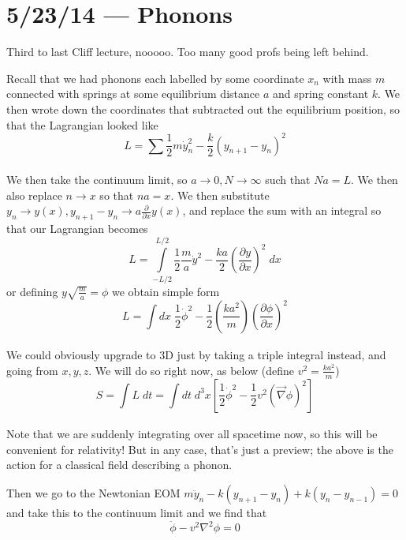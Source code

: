 \documentclass[10pt]{report}
\newcommand{\pd}[2]{\frac{\partial #1}{\partial#2}}
\begin{document}
\chapter{5/23/14 --- Phonons}

Third to last Cliff lecture, nooooo. Too many good profs being left behind.

Recall that we had phonons each labelled by some coordinate $x_n$ with mass $m$ connected with springs at some equilibrium distance $a$ and spring constant $k$. We then wrote down the coordinates that subtracted out the equilibrium position, so that the Lagrangian looked like
\begin{equation}
    L = \sum\limits_{}^{}\frac{1}{2} m\dot{y}_n^2 - \frac{k}{2}\left( y_{n+1} - y_n \right)^2
\end{equation}

We then take the continuum limit, so $a\to 0, N \to \infty$ such that $Na = L$. We then also replace $n \to x$ so that $na = x$. We then substitute $y_n \to y(x), y_{n+1} - y_n \to a \pd{}{x}y(x)$, and replace the sum with an integral so that our Lagrangian becomes
\begin{equation}
    L = \int\limits_{-L/2}^{L/2} \frac{1}{2}\frac{m}{a}\dot{y}^2 - \frac{ka}{2}\left( \pd{y}{x} \right)^2\;dx
\end{equation}
or defining $y\sqrt{\frac{m}{a}} = \phi$ we obtain simple form
\begin{equation}
    L = \int\limits_{}^{}dx\;\frac{1}{2}\dot{\phi}^2 - \frac{1}{2}\left( \frac{ka^2}{m} \right)\left( \pd{\phi}{x} \right)^2
\end{equation}

We could obviously upgrade to 3D just by taking a triple integral instead, and going from $x,y,z$. We will do so right now, as below (define $v^2 = \frac{ka^2}{m}$)
\begin{equation}
    S = \int\limits_{}^{}L\;dt = \int\limits_{}^{}dt\;d^3x\left[ \frac{1}{2}\dot{\phi}^2 - \frac{1}{2}v^2\left( \vec{\nabla}\phi \right)^2 \right]
\end{equation}

Note that we are suddenly integrating over all spacetime now, so this will be convenient for relativity! But in any case, that's just a preview; the above is the action for a classical field describing a phonon.

Then we go to the Newtonian EOM $m\ddot{y}_n - k\left( y_{n+1} - y_n \right) + k(y_n - y_{n-1}) = 0$ and take this to the continuum limit and we find that 
\begin{equation}
    \ddot{\phi} - v^2\nabla^2\phi = 0
\end{equation}
\end{document}
